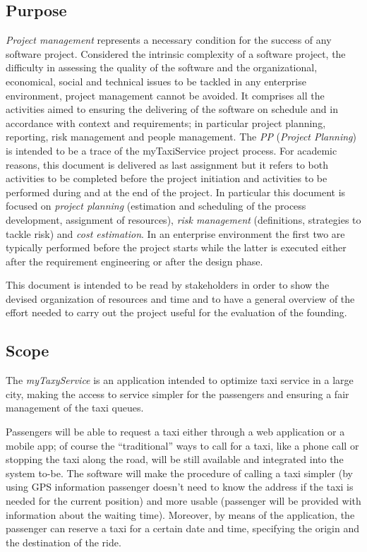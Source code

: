 
\subsection{Purpose}

\emph{Project management} represents a necessary condition for the
success of any software project. Considered the intrinsic complexity
of a software project, the difficulty in assessing the quality of
the software and the organizational, economical, social and technical
issues to be tackled in any enterprise environment, project management
cannot be avoided. It comprises all the activities aimed to ensuring
the delivering of the software on schedule and in accordance with
context and requirements; in particular project planning, reporting,
risk management and people management. The \emph{PP} (\emph{Project
Planning}) is intended to be a trace of the myTaxiService project
process. For academic reasons, this document is delivered as last
assignment but it refers to both activities to be completed before
the project initiation and activities to be performed during and at
the end of the project. In particular this document is focused on
\emph{project planning} (estimation and scheduling of the process
development, assignment of resources),\emph{ risk management }(definitions,
strategies to tackle risk) and \emph{cost estimation}. In an enterprise
environment the first two are typically performed before the project
starts while the latter is executed either after the requirement engineering
or after the design phase.

This document is intended to be read by stakeholders in order to show
the devised organization of resources and time and to have a general
overview of the effort needed to carry out the project useful for
the evaluation of the founding.


\subsection{Scope}

The \emph{myTaxyService} is an application intended to optimize taxi
service in a large city, making the access to service simpler for
the passengers and ensuring a fair management of the taxi queues. 

Passengers will be able to request a taxi either through a web application
or a mobile app; of course the ``traditional'' ways to call for
a taxi, like a phone call or stopping the taxi along the road, will
be still available and integrated into the system to-be. The software
will make the procedure of calling a taxi simpler (by using GPS information
passenger doesn't need to know the address if the taxi is needed for
the current position) and more usable (passenger will be provided
with information about the waiting time). Moreover, by means of the
application, the passenger can reserve a taxi for a certain date and
time, specifying the origin and the destination of the ride.

